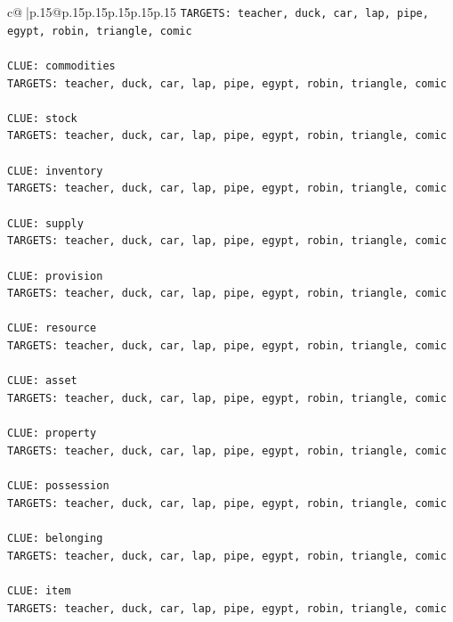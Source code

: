 \documentclass{article}
\begin{document}
{\begin{supertabular}{c@{$\;$}|p{.15\linewidth}@{}p{.15\linewidth}p{.15\linewidth}p{.15\linewidth}p{.15\linewidth}p{.15\linewidth}}
{{{\texttt{TARGETS: teacher, duck, car, lap, pipe, egypt, robin, triangle, comic} \\
\\ 
\texttt{CLUE: commodities} \\
\texttt{TARGETS: teacher, duck, car, lap, pipe, egypt, robin, triangle, comic} \\
\\ 
\texttt{CLUE: stock} \\
\texttt{TARGETS: teacher, duck, car, lap, pipe, egypt, robin, triangle, comic} \\
\\ 
\texttt{CLUE: inventory} \\
\texttt{TARGETS: teacher, duck, car, lap, pipe, egypt, robin, triangle, comic} \\
\\ 
\texttt{CLUE: supply} \\
\texttt{TARGETS: teacher, duck, car, lap, pipe, egypt, robin, triangle, comic} \\
\\ 
\texttt{CLUE: provision} \\
\texttt{TARGETS: teacher, duck, car, lap, pipe, egypt, robin, triangle, comic} \\
\\ 
\texttt{CLUE: resource} \\
\texttt{TARGETS: teacher, duck, car, lap, pipe, egypt, robin, triangle, comic} \\
\\ 
\texttt{CLUE: asset} \\
\texttt{TARGETS: teacher, duck, car, lap, pipe, egypt, robin, triangle, comic} \\
\\ 
\texttt{CLUE: property} \\
\texttt{TARGETS: teacher, duck, car, lap, pipe, egypt, robin, triangle, comic} \\
\\ 
\texttt{CLUE: possession} \\
\texttt{TARGETS: teacher, duck, car, lap, pipe, egypt, robin, triangle, comic} \\
\\ 
\texttt{CLUE: belonging} \\
\texttt{TARGETS: teacher, duck, car, lap, pipe, egypt, robin, triangle, comic} \\
\\ 
\texttt{CLUE: item} \\
\texttt{TARGETS: teacher, duck, car, lap, pipe, egypt, robin, triangle, comic} \\
}}}
\end{supertabular}}
\end{document}
